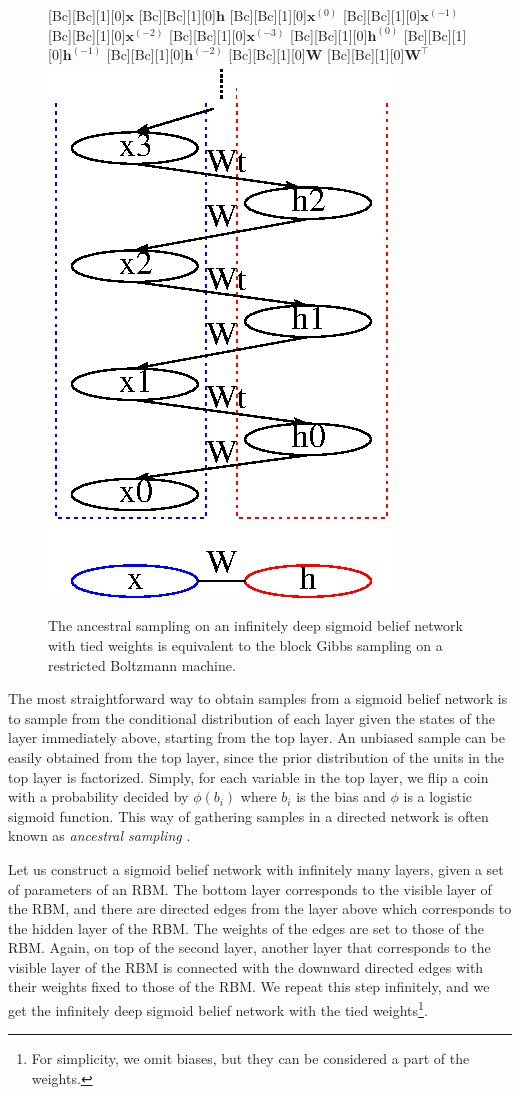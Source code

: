 \documentclass[dissertation,nocontribution,draft*]{aaltoseries}
\newcommand{\vect}[1]{\mathbf{#1}}
\newcommand{\matr}[1]{\mathbf{#1}}
\newcommand{\vh}[0]{\vect{h}}
\newcommand{\vx}[0]{\vect{x}}
\newcommand{\mW}[0]{\matr{W}}
\begin{document}
\begin{figure}
    \centering
    [Bc][Bc][1][0]{$\vx$}
    [Bc][Bc][1][0]{$\vh$}
    [Bc][Bc][1][0]{$\vx^{(0)}$}
    [Bc][Bc][1][0]{$\vx^{(-1)}$}
    [Bc][Bc][1][0]{$\vx^{(-2)}$}
    [Bc][Bc][1][0]{$\vx^{(-3)}$}
    [Bc][Bc][1][0]{$\vh^{(0)}$}
    [Bc][Bc][1][0]{$\vh^{(-1)}$}
    [Bc][Bc][1][0]{$\vh^{(-2)}$}
    [Bc][Bc][1][0]{$\mW$}
    [Bc][Bc][1][0]{$\mW^\top$}
    \includegraphics[width=0.4\columnwidth]{figures/rbm_dbn.eps}
    \caption{The ancestral sampling on an infinitely deep
    sigmoid belief network with tied weights is equivalent
    to the block Gibbs sampling on a restricted Boltzmann
    machine.}
    \label{fig:inf_sbn}
\end{figure}

The most straightforward way to obtain samples from a
sigmoid belief network is to sample from the conditional
distribution of each layer given the states of the layer
immediately above, starting from the top layer. An unbiased
sample can be easily obtained from the top layer, since the
prior distribution of the units in the top layer is
factorized. Simply, for each variable in the top layer, we
flip a coin with a probability decided by $\phi(b_i)$
where $b_i$ is the bias and $\phi$ is a logistic sigmoid
function. This way of gathering samples in a directed
network is often known as \textit{ancestral sampling}
\citep[see, e.g.,][]{Bishop2006,Murphy2012}.

Let us construct a sigmoid belief network with infinitely
many layers, given a set of parameters of an RBM. The bottom
layer corresponds to the visible layer of the RBM, and there
are directed edges from the layer above which corresponds to
the hidden layer of the RBM. The weights of the edges are
set to those of the RBM. Again, on top of the second layer,
another layer that corresponds to the visible layer of the
RBM is connected with the downward directed edges with their
weights fixed to those of the RBM. We repeat this step
infinitely, and we get the infinitely deep sigmoid belief
network with the tied weights\footnote{For simplicity, we
omit biases, but they can be considered a part of the
weights.}. 
\end{document}

